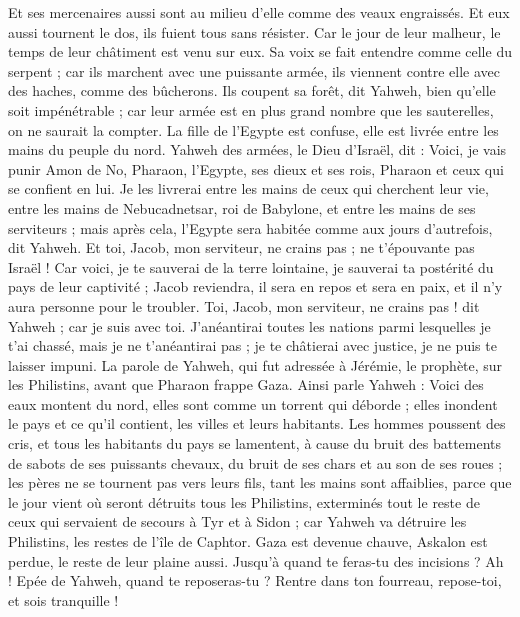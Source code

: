 \begin{multicols}{2}
Et ses mercenaires aussi sont au milieu d'elle comme des veaux engraissés. Et eux aussi tournent le dos, ils fuient tous sans résister. Car le jour de leur malheur, le temps de leur châtiment est venu sur eux.
Sa voix se fait entendre comme celle du serpent ; car ils marchent avec une puissante armée, ils viennent contre elle avec des haches, comme des bûcherons.
Ils coupent sa forêt, dit Yahweh, bien qu'elle soit impénétrable ; car leur armée est en plus grand nombre que les sauterelles, on ne saurait la compter.
La fille de l'Egypte est confuse, elle est livrée entre les mains du peuple du nord.
Yahweh des armées, le Dieu d'Israël, dit : Voici, je vais punir Amon de No, Pharaon, l'Egypte, ses dieux et ses rois, Pharaon et ceux qui se confient en lui.
Je les livrerai entre les mains de ceux qui cherchent leur vie, entre les mains de Nebucadnetsar, roi de Babylone, et entre les mains de ses serviteurs ; mais après cela, l'Egypte sera habitée comme aux jours d'autrefois, dit Yahweh.
Et toi, Jacob, mon serviteur, ne crains pas ; ne t'épouvante pas Israël ! Car voici, je te sauverai de la terre lointaine, je sauverai ta postérité du pays de leur captivité ; Jacob reviendra, il sera en repos et sera en paix, et il n'y aura personne pour le troubler.
Toi, Jacob, mon serviteur, ne crains pas ! dit Yahweh ; car je suis avec toi. J'anéantirai toutes les nations parmi lesquelles je t'ai chassé, mais je ne t'anéantirai pas ; je te châtierai avec justice, je ne puis te laisser impuni.
\VerseOne{}La parole de Yahweh, qui fut adressée à Jérémie, le prophète, sur les Philistins, avant que Pharaon frappe Gaza.
Ainsi parle Yahweh : Voici des eaux montent du nord, elles sont comme un torrent qui déborde ; elles inondent le pays et ce qu'il contient, les villes et leurs habitants. Les hommes poussent des cris, et tous les habitants du pays se lamentent,
à cause du bruit des battements de sabots de ses puissants chevaux, du bruit de ses chars et au son de ses roues ; les pères ne se tournent pas vers leurs fils, tant les mains sont affaiblies,
parce que le jour vient où seront détruits tous les Philistins, exterminés tout le reste de ceux qui servaient de secours à Tyr et à Sidon ; car Yahweh va détruire les Philistins, les restes de l'île de Caphtor.
Gaza est devenue chauve, Askalon est perdue, le reste de leur plaine aussi. Jusqu'à quand te feras-tu des incisions ?
Ah ! Epée de Yahweh, quand te reposeras-tu ? Rentre dans ton fourreau, repose-toi, et sois tranquille !

\end{multicols}
